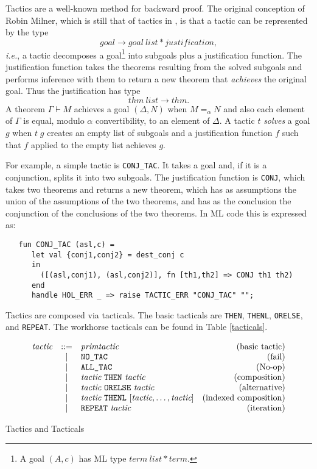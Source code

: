 Tactics are a well-known method for backward proof. The original
conception of Robin Milner, which is still that of tactics in
\HOL, is that a tactic can be represented by the type
\[ goal \longrightarrow goal\ list * justification, \]
{\it i.e.}, a tactic decomposes a goal\footnote{A goal $(A,c)$ has ML
type $term\ list * term$.} into subgoals plus a
justification function. The justification function takes the theorems
resulting from the solved subgoals and performs inference with them to
return a new theorem that {\it achieves} the original goal. Thus the
justification has type
 \[  thm\ list \longrightarrow thm.  \]
 A theorem $\Gamma \vdash M$ achieves a goal $(\Delta,N)$ when $M =_\alpha
 N$ and also each element of $\Gamma$ is equal, modulo $\alpha$
 convertibility, to an element of $\Delta$. A tactic $t$ {\it solves\/} a
 goal $g$ when $t\; g$ creates an empty list of subgoals and a
 justification function $f$ such that $f$ applied to the empty list
 achieves $g$. 

For example, a simple tactic is \verb+CONJ_TAC+. It takes a goal and, if
it is a conjunction, splits it into two subgoals. The justification
function is \verb+CONJ+, which takes two theorems and returns a new
theorem, which has as assumptions the union of the assumptions of the
two theorems, and has as the conclusion the conjunction of the
conclusions of the two theorems. In ML code this is expressed as:

\begin{verbatim}
   fun CONJ_TAC (asl,c) =
      let val {conj1,conj2} = dest_conj c 
      in 
        ([(asl,conj1), (asl,conj2)], fn [th1,th2] => CONJ th1 th2)
      end
      handle HOL_ERR _ => raise TACTIC_ERR "CONJ_TAC" "";
\end{verbatim}

Tactics are composed via tacticals. The basic tacticals are \verb+THEN+,
\verb+THENL+, \verb+ORELSE+, and \verb+REPEAT+. The workhorse tacticals
can be found in Table \ref{tacticals}.

\begin{table}
\[
\begin{array}{rclr}
 \tactic & ::= & \primtactic & \mbox{(basic tactic)} \\
 & | & \verb+NO_TAC+ & \mbox{(fail)} \\
 & | & \verb+ALL_TAC+ & \mbox{(No-op)} \\
 & | & \tactic\ \verb+THEN+ \ \tactic & \mbox{(composition)} \\
 & | & \tactic\ \verb+ORELSE+ \ \tactic & \mbox{(alternative)} \\
 & | & \tactic\ \verb+THENL+ \ [\tactic, \ldots, \tactic] &
\mbox{(indexed composition)} \\  
 & | & \verb+REPEAT+\ \tactic & \mbox{(iteration)} \\
\end{array}
\]
\caption{Tactics and Tacticals} \label{tacticals}
\end{table}


